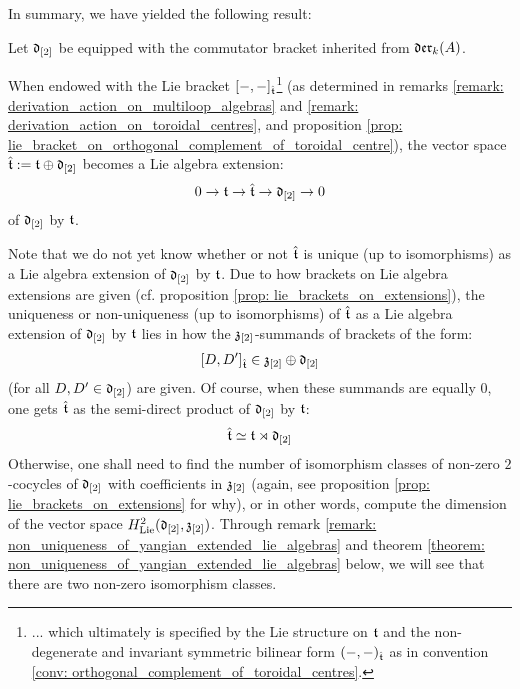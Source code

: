         In summary, we have yielded the following result:
        \begin{theorem} \label{theorem: extended_toroidal_lie_algebras}
            Let $\mathfrak{d}_{[2]}$ be equipped with the commutator bracket inherited from $\mathfrak{der}_k(A)$.
        
            When endowed with the Lie bracket $[-, -]_{\hat{\mathfrak{t}}}$\footnote{... which ultimately is specified by the Lie structure on $\mathfrak{t}$ and the non-degenerate and invariant symmetric bilinear form $(-, -)_{\hat{\mathfrak{t}}}$ as in convention \ref{conv: orthogonal_complement_of_toroidal_centres}.} (as determined in remarks \ref{remark: derivation_action_on_multiloop_algebras} and \ref{remark: derivation_action_on_toroidal_centres}, and proposition \ref{prop: lie_bracket_on_orthogonal_complement_of_toroidal_centre}), the vector space $\hat{\mathfrak{t}} := \mathfrak{t} \oplus \mathfrak{d}_{[2]}$ becomes a Lie algebra extension:
                $$0 \to \mathfrak{t} \to \hat{\mathfrak{t}} \to \mathfrak{d}_{[2]} \to 0$$
            of $\mathfrak{d}_{[2]}$ by $\mathfrak{t}$. 
        \end{theorem}
        \begin{remark}
            Note that we do not yet know whether or not $\hat{\mathfrak{t}}$ is unique (up to isomorphisms) as a Lie algebra extension of $\mathfrak{d}_{[2]}$ by $\mathfrak{t}$. Due to how brackets on Lie algebra extensions are given (cf. proposition \ref{prop: lie_brackets_on_extensions}), the uniqueness or non-uniqueness (up to isomorphisms) of $\hat{\mathfrak{t}}$ as a Lie algebra extension of $\mathfrak{d}_{[2]}$ by $\mathfrak{t}$ lies in how the $\mathfrak{z}_{[2]}$-summands of brackets of the form:
                $$[D, D']_{\hat{\mathfrak{t}}} \in \mathfrak{z}_{[2]} \oplus \mathfrak{d}_{[2]}$$
            (for all $D, D' \in \mathfrak{d}_{[2]}$) are given. Of course, when these summands are equally $0$, one gets $\hat{\mathfrak{t}}$ as the semi-direct product of $\mathfrak{d}_{[2]}$ by $\mathfrak{t}$:
                $$\hat{\mathfrak{t}} \simeq \mathfrak{t} \rtimes \mathfrak{d}_{[2]}$$
            Otherwise, one shall need to find the number of isomorphism classes of non-zero $2$-cocycles of $\mathfrak{d}_{[2]}$ with coefficients in $\mathfrak{z}_{[2]}$ (again, see proposition \ref{prop: lie_brackets_on_extensions} for why), or in other words, compute the dimension of the vector space $H^2_{\mathrm{Lie}}(\mathfrak{d}_{[2]}, \mathfrak{z}_{[2]})$. Through remark \ref{remark: non_uniqueness_of_yangian_extended_lie_algebras} and theorem \ref{theorem: non_uniqueness_of_yangian_extended_lie_algebras} below, we will see that there are two non-zero isomorphism classes.
        \end{remark}
